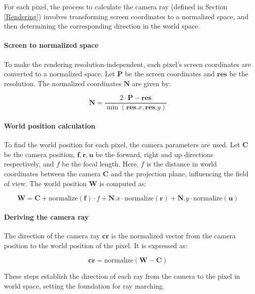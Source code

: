For each pixel, the process to calculate the camera ray (defined in Section \ref{Rendering}) involves transforming screen coordinates to a normalized space, and then determining the corresponding direction in the world space.

\paragraph{Screen to normalized space}
To make the rendering resolution-independent, each pixel's screen coordinates are converted to a normalized space. Let $\mathbf{P}$ be the screen coordinates and $\mathbf{res}$ be the resolution. The normalized coordinates $\mathbf{N}$ are given by:

\begin{equation}
   \mathbf{N} = \frac{2 \cdot \mathbf{P} - \mathbf{res}}{\min(\mathbf{res}.x, \mathbf{res}.y)}
\end{equation}

\paragraph{World position calculation}
To find the world position for each pixel, the camera parameters are used. Let $\mathbf{C}$ be the camera position, $\mathbf{f}, \mathbf{r}, \mathbf{u}$ be the forward, right and up directions respectively, and $f$ be the focal length. Here, $f$ is the distance in world coordinates between the camera $\mathbf{C}$ and the projection plane, influencing the field of view. The world position $\mathbf{W}$ is computed as:

\begin{equation}
   \mathbf{W} = \mathbf{C} + \text{normalize}(\mathbf{f}) \cdot f + \mathbf{N}.x \cdot \text{normalize}(\mathbf{r}) + \mathbf{N}.y \cdot \text{normalize}(\mathbf{u})
\end{equation}

\paragraph{Deriving the camera ray}
The direction of the camera ray $\mathbf{cr}$ is the normalized vector from the camera position to the world position of the pixel. It is expressed as:

\begin{equation}
   \mathbf{cr} = \text{normalize}(\mathbf{W} - \mathbf{C})
\end{equation}

These steps establish the direction of each ray from the camera to the pixel in world space, setting the foundation for ray marching.

